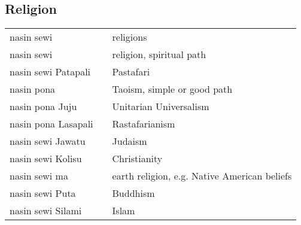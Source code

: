 \subsection{Religion}
%
\begin{supertabular}{p{4,5cm}|ll}
nasin sewi && religions \\
nasin sewi && religion, spiritual path \\
nasin sewi Patapali && Pastafari \\
nasin pona && Taoism, simple or good path \\
nasin pona Juju && Unitarian Universalism \\ 
nasin pona Lasapali && Rastafarianism \\
nasin sewi Jawatu && Judaism \\
nasin sewi Kolisu && Christianity \\
nasin sewi ma && earth religion, e.g. Native American beliefs \\
nasin sewi Puta && Buddhism \\
nasin sewi Silami && Islam \\
\end{supertabular} \\
%
%
